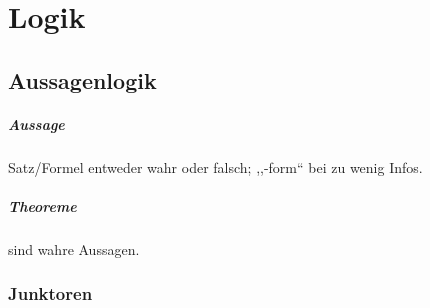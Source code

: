 \chapter{Logik}

\section{Aussagenlogik}

\paragraph{Aussage} Satz/Formel entweder wahr oder falsch;
,,-form`` bei zu wenig Infos.

\paragraph{Theoreme} sind wahre Aussagen.

\subsection{Junktoren}

